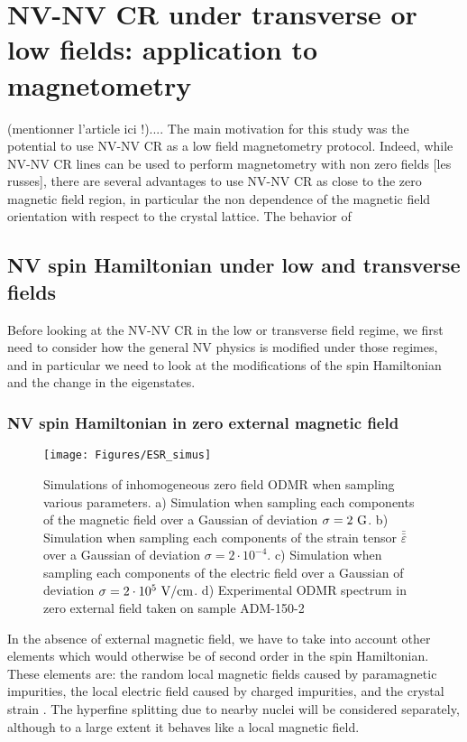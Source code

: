 \documentclass[a4paper,11pt]{report}
\title{}
\begin{document}
\chapter{NV-NV CR under transverse or low fields: application to magnetometry}

(mentionner l'article ici !).... The main motivation for this study was the potential to use NV-NV CR as a low field magnetometry protocol. Indeed, while NV-NV CR lines can be used to perform magnetometry with non zero fields [les russes], there are several advantages to use NV-NV CR as close to the zero magnetic field region, in particular the non dependence of the magnetic field orientation with respect to the crystal lattice. The behavior of 

\section{NV spin Hamiltonian under low and transverse fields}

Before looking at the NV-NV CR in the low or transverse field regime, we first need to consider how the general NV physics is modified under those regimes, and in particular we need to look at the modifications of the spin Hamiltonian and the change in the eigenstates.

\subsection{NV spin Hamiltonian in zero external magnetic field}
\begin{figure}[h]
\centering
\texttt{[image: Figures/ESR\_simus]}
\caption{Simulations of inhomogeneous zero field ODMR when sampling various parameters. a) Simulation when sampling each components of the magnetic field over a Gaussian of deviation $\sigma=2\ \rm G$. b) Simulation when sampling each components of the strain tensor $\bar{\bar{\varepsilon}}$ over a Gaussian of deviation $\sigma=2\cdot 10^{-4}$. c) Simulation when sampling each components of the electric field over a Gaussian of deviation $\sigma=2\cdot 10^{5}\ \rm{V/cm}$. d) Experimental ODMR spectrum in zero external field taken on sample ADM-150-2}
\label{simus ESR}
\end{figure}

In the absence of external magnetic field, we have to take into account other elements which would otherwise be of second order in the spin Hamiltonian. These elements are: the random local magnetic fields caused by paramagnetic impurities, the local electric field caused by charged impurities, and the crystal strain \citep{doherty2012theory, udvarhelyi2018spin, mittiga2018imaging}. The hyperfine splitting due to nearby nuclei will be considered separately, although to a large extent it behaves like a local magnetic field.
\end{document}
